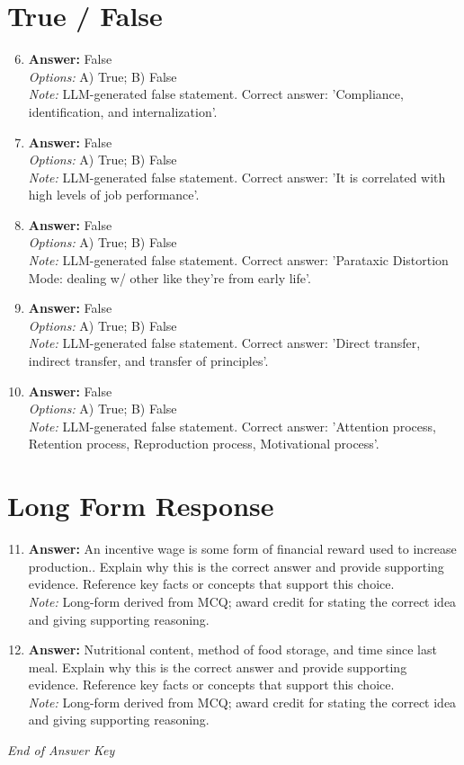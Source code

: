 \documentclass[12pt]{article}
\begin{document}
\section*{True / False}
\begin{enumerate}[label=\arabic*.]
\setcounter{enumi}{5}
\item \textbf{Answer:} False
\\ \textit{Options:} A) True; B) False
\\ \textit{Note:} LLM-generated false statement. Correct answer: 'Compliance, identification, and internalization'.
\item \textbf{Answer:} False
\\ \textit{Options:} A) True; B) False
\\ \textit{Note:} LLM-generated false statement. Correct answer: 'It is correlated with high levels of job performance'.
\item \textbf{Answer:} False
\\ \textit{Options:} A) True; B) False
\\ \textit{Note:} LLM-generated false statement. Correct answer: 'Parataxic Distortion Mode: dealing w/ other like they're from early life'.
\item \textbf{Answer:} False
\\ \textit{Options:} A) True; B) False
\\ \textit{Note:} LLM-generated false statement. Correct answer: 'Direct transfer, indirect transfer, and transfer of principles'.
\item \textbf{Answer:} False
\\ \textit{Options:} A) True; B) False
\\ \textit{Note:} LLM-generated false statement. Correct answer: 'Attention process, Retention process, Reproduction process, Motivational process'.
\end{enumerate}

\section*{Long Form Response}
\begin{enumerate}[label=\arabic*.]
\setcounter{enumi}{10}
\item \textbf{Answer:} An incentive wage is some form of financial reward used to increase production.. Explain why this is the correct answer and provide supporting evidence. Reference key facts or concepts that support this choice.
\\ \textit{Note:} Long-form derived from MCQ; award credit for stating the correct idea and giving supporting reasoning.
\item \textbf{Answer:} Nutritional content, method of food storage, and time since last meal. Explain why this is the correct answer and provide supporting evidence. Reference key facts or concepts that support this choice.
\\ \textit{Note:} Long-form derived from MCQ; award credit for stating the correct idea and giving supporting reasoning.
\end{enumerate}

\vfill
\noindent\textit{End of Answer Key}
\end{document}
